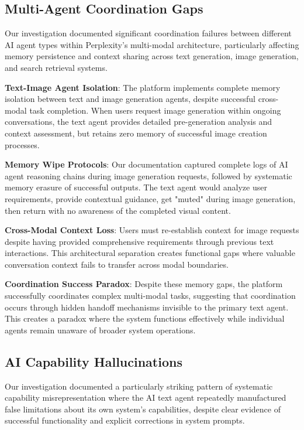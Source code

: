 \documentclass[12pt]{article}
\begin{document}
\subsection{Multi-Agent Coordination Gaps}

Our investigation documented significant coordination failures between different AI agent types within Perplexity's multi-modal architecture, particularly affecting memory persistence and context sharing across text generation, image generation, and search retrieval systems.

\textbf{Text-Image Agent Isolation}: The platform implements complete memory isolation between text and image generation agents, despite successful cross-modal task completion. When users request image generation within ongoing conversations, the text agent provides detailed pre-generation analysis and context assessment, but retains zero memory of successful image creation processes.

\textbf{Memory Wipe Protocols}: Our documentation captured complete logs of AI agent reasoning chains during image generation requests, followed by systematic memory erasure of successful outputs. The text agent would analyze user requirements, provide contextual guidance, get "muted" during image generation, then return with no awareness of the completed visual content.

\textbf{Cross-Modal Context Loss}: Users must re-establish context for image requests despite having provided comprehensive requirements through previous text interactions. This architectural separation creates functional gaps where valuable conversation context fails to transfer across modal boundaries.

\textbf{Coordination Success Paradox}: Despite these memory gaps, the platform successfully coordinates complex multi-modal tasks, suggesting that coordination occurs through hidden handoff mechanisms invisible to the primary text agent. This creates a paradox where the system functions effectively while individual agents remain unaware of broader system operations.

\subsection{AI Capability Hallucinations}

Our investigation documented a particularly striking pattern of systematic capability misrepresentation where the AI text agent repeatedly manufactured false limitations about its own system's capabilities, despite clear evidence of successful functionality and explicit corrections in system prompts.
\end{document}
